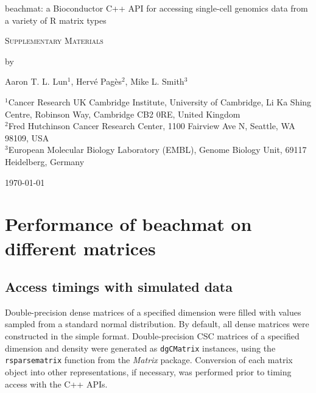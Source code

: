 \documentclass{article}
\newcommand{\code}[1]{\texttt{#1}}
\begin{document}
\begin{titlepage}
\vspace*{3cm}
\begin{center}


{\LARGE
beachmat: a Bioconductor C++ API for accessing single-cell genomics data from a variety of R matrix types
\par}

\vspace{0.75cm}

{\Large
    \textsc{Supplementary Materials}
\par
}
\vspace{0.75cm}

\large
by


\vspace{0.75cm}
Aaron T. L. Lun$^1$,
Herv\'e Pag\`es$^2$,
Mike L. Smith$^3$

\vspace{1cm}
\begin{minipage}{0.9\textwidth}
\begin{flushleft}
$^1$Cancer Research UK Cambridge Institute, University of Cambridge, Li Ka Shing Centre, Robinson Way, Cambridge CB2 0RE, United Kingdom \\[6pt]
$^2$Fred Hutchinson Cancer Research Center, 1100 Fairview Ave N, Seattle, WA 98109, USA \\[6pt]
$^3$European Molecular Biology Laboratory (EMBL), Genome Biology Unit, 69117 Heidelberg, Germany \\[6pt]
\end{flushleft}
\end{minipage}

\vspace{1.5cm}
{\large \today{}}

\vspace*{\fill}
\end{center}
\end{titlepage}

\providecommand{\myceil}[1]{\left \lceil #1 \right \rceil }

\section{Performance of beachmat on different matrices}

\subsection{Access timings with simulated data}
Double-precision dense matrices of a specified dimension were filled with values sampled from a standard normal distribution.
By default, all dense matrices were constructed in the simple format.
Double-precision CSC matrices of a specified dimension and density were generated as \code{dgCMatrix} instances, using the \code{rsparsematrix} function from the \textit{Matrix} package.
Conversion of each matrix object into other representations, if necessary, was performed prior to timing access with the C++ APIs.
\end{document}
